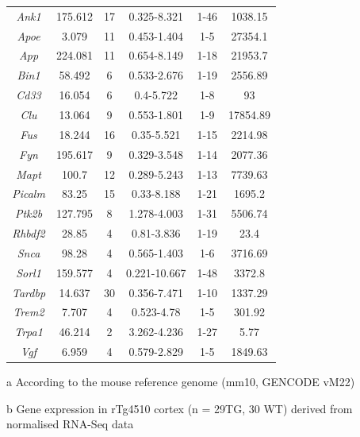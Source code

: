 \begin{table}[]
\begin{threeparttable}
\begin{tabular}{@{}cccccc@{}}
		\textit{Ank1}   & 175.612 & 17 & 0.325-8.321  & 1-46 & 1038.15  \\
		\textit{Apoe}   & 3.079   & 11 & 0.453-1.404  & 1-5  & 27354.1  \\
		\textit{App}    & 224.081 & 11 & 0.654-8.149  & 1-18 & 21953.7  \\
		\textit{Bin1}   & 58.492  & 6  & 0.533-2.676  & 1-19 & 2556.89  \\
		\textit{Cd33}   & 16.054  & 6  & 0.4-5.722    & 1-8  & 93       \\
		\textit{Clu}    & 13.064  & 9  & 0.553-1.801  & 1-9  & 17854.89 \\
		\textit{Fus}    & 18.244  & 16 & 0.35-5.521   & 1-15 & 2214.98  \\
		\textit{Fyn}    & 195.617 & 9  & 0.329-3.548  & 1-14 & 2077.36  \\
		\textit{Mapt}   & 100.7   & 12 & 0.289-5.243  & 1-13 & 7739.63  \\
		\textit{Picalm} & 83.25   & 15 & 0.33-8.188   & 1-21 & 1695.2   \\
		\textit{Ptk2b}  & 127.795 & 8  & 1.278-4.003  & 1-31 & 5506.74  \\
		\textit{Rhbdf2} & 28.85   & 4  & 0.81-3.836   & 1-19 & 23.4     \\
		\textit{Snca}   & 98.28   & 4  & 0.565-1.403  & 1-6  & 3716.69  \\
		\textit{Sorl1}  & 159.577 & 4  & 0.221-10.667 & 1-48 & 3372.8   \\
		\textit{Tardbp} & 14.637  & 30 & 0.356-7.471  & 1-10 & 1337.29  \\
		\textit{Trem2}  & 7.707   & 4  & 0.523-4.78   & 1-5  & 301.92   \\
		\textit{Trpa1}  & 46.214  & 2  & 3.262-4.236  & 1-27 & 5.77     \\
		\textit{Vgf}    & 6.959   & 4  & 0.579-2.829  & 1-5  & 1849.63  \\ \bottomrule
	\end{tabular}
		\begin{tablenotes}
	\footnotesize
	\item[a] According to the mouse reference genome (mm10, GENCODE vM22)
	\item[b] Gene expression in rTg4510 cortex (n = 29TG, 30 WT) derived from normalised RNA-Seq data\cite{Castanho2020}
\end{tablenotes}
\end{threeparttable}
\end{table}

